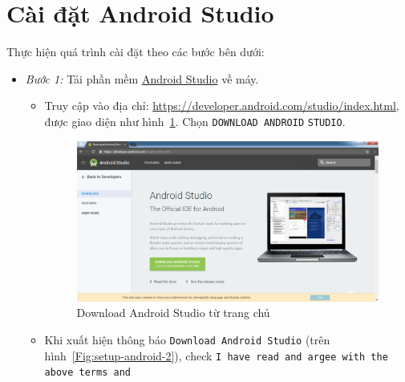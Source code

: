 \documentclass[13pt,a4paper]{extreport}
\begin{document}
\section{Cài đặt Android Studio}\label{Sec:Android}
	Thực hiện quá trình cài đặt theo các bước bên dưới:
	\begin{itemize}
		\item \textit{Bước 1:} Tải phần mềm \href{https://developer.android.com/studio/index.html}{Android Studio} về máy.
			\begin{itemize}
				\item Truy cập vào địa chỉ: \url{https://developer.android.com/studio/index.html}, được giao diện như hình~\ref{Fig:setup-android-1}. Chọn \verb|DOWNLOAD ANDROID| \verb|STUDIO|.				
					\begin{figure}[!h]						
							\begin{center}
								\includegraphics[scale=0.35]{images/android-studio-setup/setup-android-1.png}
							\end{center}
						\caption{Download Android Studio từ trang chủ}
						\label{Fig:setup-android-1}
					\end{figure}

				\item Khi xuất hiện thông báo \verb|Download Android Studio| (trên hình~\ref{Fig:setup-android-2}), check \verb|I have read and argee with the above terms and|
				

\end{itemize}
\end{itemize}
\end{document}
